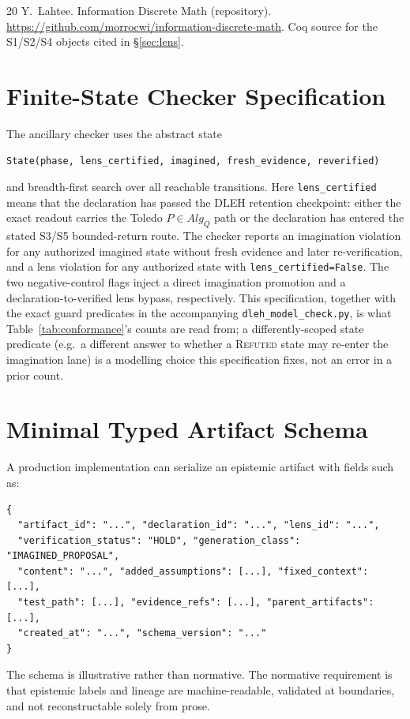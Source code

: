 \documentclass[10pt,twocolumn]{article}
\begin{document}
\begin{sloppypar}
\begin{thebibliography}{20}
 Y.~Lahtee. Information Discrete Math (repository). \url{https://github.com/morrocwi/information-discrete-math}. Coq source for the S1/S2/S4 objects cited in \S\ref{sec:lens}.

\end{thebibliography}
\end{sloppypar}

\appendix
\section{Finite-State Checker Specification}
The ancillary checker uses the abstract state
\begin{lstlisting}
State(phase, lens_certified, imagined, fresh_evidence, reverified)
\end{lstlisting}
and breadth-first search over all reachable transitions. Here \texttt{lens\_certified} means that the declaration has passed the DLEH retention checkpoint: either the exact readout carries the Toledo $P \in Alg_Q$ path or the declaration has entered the stated S3/S5 bounded-return route. The checker reports an imagination violation for any authorized imagined state without fresh evidence and later re-verification, and a lens violation for any authorized state with \texttt{lens\_certified=False}. The two negative-control flags inject a direct imagination promotion and a declaration-to-verified lens bypass, respectively. This specification, together with the exact guard predicates in the accompanying \texttt{dleh\_model\_check.py}, is what Table~\ref{tab:conformance}'s counts are read from; a differently-scoped state predicate (e.g.\ a different answer to whether a \textsc{Refuted} state may re-enter the imagination lane) is a modelling choice this specification fixes, not an error in a prior count.

\section{Minimal Typed Artifact Schema}
A production implementation can serialize an epistemic artifact with fields such as:
\begin{lstlisting}
{
  "artifact_id": "...", "declaration_id": "...", "lens_id": "...",
  "verification_status": "HOLD", "generation_class": "IMAGINED_PROPOSAL",
  "content": "...", "added_assumptions": [...], "fixed_context": [...],
  "test_path": [...], "evidence_refs": [...], "parent_artifacts": [...],
  "created_at": "...", "schema_version": "..."
}
\end{lstlisting}
The schema is illustrative rather than normative. The normative requirement is that epistemic labels and lineage are machine-readable, validated at boundaries, and not reconstructable solely from prose.
\end{document}
